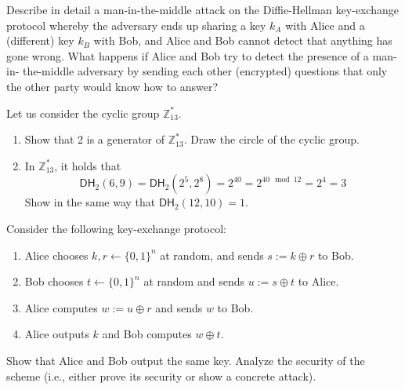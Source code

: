 \documentclass[a4paper,10pt,landscape,twocolumn]{scrartcl}
\begin{document}
\begin{exercise}
 \begin{subex}
Describe in detail a man-in-the-middle attack on the Diffie-Hellman key-exchange protocol whereby the adversary ends up sharing a key $k_A$ with Alice and a (different) key $k_B$ with Bob, and Alice and Bob cannot detect that anything has gone wrong.
What happens if Alice and Bob try to detect the presence of a man-in- the-middle adversary by sending each other (encrypted) questions that only the other party would know how to answer?
\end{subex}

\begin{subex}
Let us consider the cyclic group $\mathbb{Z}_{13}^*$.
\begin{enumerate}
\item Show that 2 is a generator of $\mathbb{Z}_{13}^*$. Draw the
  circle of the cyclic group.
\item In $\mathbb{Z}_{13}^*$, it holds that 
\[
\mathsf{DH}_2(6,9) = \mathsf{DH}_2(2^5, 2^8) = 2^{40} = 2^{40 \mod 12} = 2^4 = 3
\]
Show in the same way that $\mathsf{DH}_2(12,10)=1$.
\end{enumerate}

\end{subex}

\end{exercise}

\begin{exercise}
  Consider the following key-exchange protocol:
\begin{enumerate}
\item Alice chooses $k,r \leftarrow \{0,1\}^n$ at random, and sends $s := k \oplus r$ to Bob.
\item Bob chooses $t\leftarrow \{0,1\}^n$ at random and sends
  $u:=s \oplus t$ to Alice.
\item Alice computes $w := u \oplus r$ and sends $w$ to Bob.
\item Alice outputs $k$ and Bob computes $w \oplus t$.
\end{enumerate}
Show that Alice and Bob output the same key. Analyze the security of
the scheme (i.e., either prove its security or show a concrete
attack).
\end{exercise}
\end{document}
